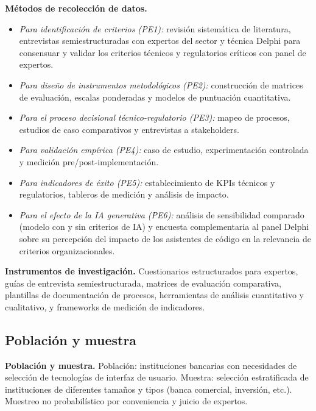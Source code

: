 \textbf{Métodos de recolección de datos.}
        \begin{itemize}
          \item \emph{Para identificación de criterios (PE1):} revisión
                sistemática de literatura, entrevistas semiestructuradas con
                expertos del sector y técnica Delphi para consensuar y validar
                los criterios técnicos y regulatorios críticos con panel de
                expertos.
          \item \emph{Para diseño de instrumentos metodológicos (PE2):}
                construcción de matrices de evaluación, escalas ponderadas y
                modelos de puntuación cuantitativa.
          \item \emph{Para el proceso decisional técnico-regulatorio (PE3):}
                mapeo de procesos, estudios de caso comparativos y
                entrevistas a stakeholders.
          \item \emph{Para validación empírica (PE4):} caso de estudio,
                experimentación controlada y medición pre/post-implementación.
          \item \emph{Para indicadores de éxito (PE5):} establecimiento de KPIs
                técnicos y regulatorios, tableros de medición y análisis de
                impacto.
          \item \emph{Para el efecto de la IA generativa (PE6):} análisis de
                sensibilidad comparado (modelo con y sin criterios de IA) y
                encuesta complementaria al panel Delphi sobre su percepción
                del impacto de los asistentes de código en la relevancia de
                criterios organizacionales.
        \end{itemize}



\textbf{Instrumentos de investigación.} Cuestionarios estructurados
        para expertos, guías de entrevista semiestructurada, matrices de
        evaluación comparativa, plantillas de documentación de procesos,
        herramientas de análisis cuantitativo y cualitativo, y frameworks de
        medición de indicadores.


\subsection{Población y muestra}

\textbf{Población y muestra.} Población: instituciones bancarias con
        necesidades de selección de tecnologías de interfaz de usuario.
        Muestra: selección estratificada de instituciones de diferentes
        tamaños y tipos (banca comercial, inversión, etc.). Muestreo no
        probabilístico por conveniencia y juicio de expertos.



